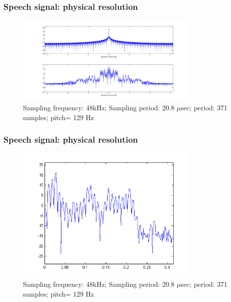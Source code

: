 \begin{frame}
\frametitle{Speech signal: physical resolution}
\begin{figure}
  \centering
  \includegraphics[width=0.8\textwidth]{speech-spectrum}
  \caption{Sampling frequency: 48kHz; Sampling period: 20.8 $\mu$sec; period: 371 samples; pitch= 129 Hz }
\end{figure}
\end{frame}

\begin{frame}
\frametitle{Speech signal: physical resolution}
\begin{figure}
  \centering
  \includegraphics[width=0.8\textwidth]{speech-spectrum-extract}
  \caption{Sampling frequency: 48kHz; Sampling period: 20.8 $\mu$sec; period: 371 samples; pitch= 129 Hz }
\end{figure}
\end{frame}




